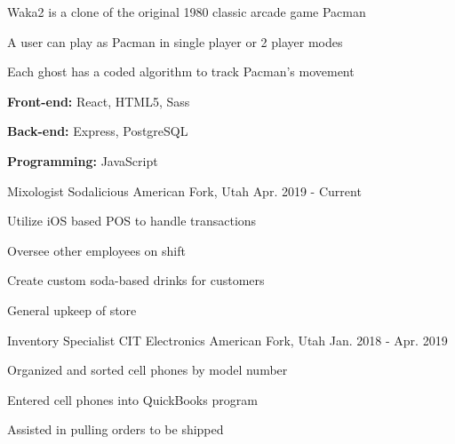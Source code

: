 \begin{cventries}
{\begin{cvitems}
        \begin{cvitems}
          \begin{multicols}{2}
            \item {Waka2 is a clone of the original 1980 classic arcade game Pacman}
            \item {A user can play as Pacman in single player or 2 player modes}
            \item {Each ghost has a coded algorithm to track Pacman's movement}
            \item {\textbf{Front-end:} React, HTML5, Sass}
            \item {\textbf{Back-end:} Express, PostgreSQL}
            \item {\textbf{Programming:} JavaScript}
          \end{multicols}
        \end{cvitems}
      \end{cvitems}
    }

  \cventry
    {Mixologist} %
    {Sodalicious} %
    {American Fork, Utah} %
    {Apr. 2019 - Current} %
    {
      \begin{cvitems} %
        \item {Utilize iOS based POS to handle transactions}
        \item {Oversee other employees on shift}
        \item {Create custom soda-based drinks for customers}
        \item {General upkeep of store}
      \end{cvitems}
    }

  \cventry
    {Inventory Specialist} %
    {CIT Electronics} %
    {American Fork, Utah} %
    {Jan. 2018 - Apr. 2019} %
    {
      \begin{cvitems} %
        \item {Organized and sorted cell phones by model number}
        \item {Entered cell phones into QuickBooks program}
        \item {Assisted in pulling orders to be shipped}
      \end{cvitems}
    }


\end{cventries}
